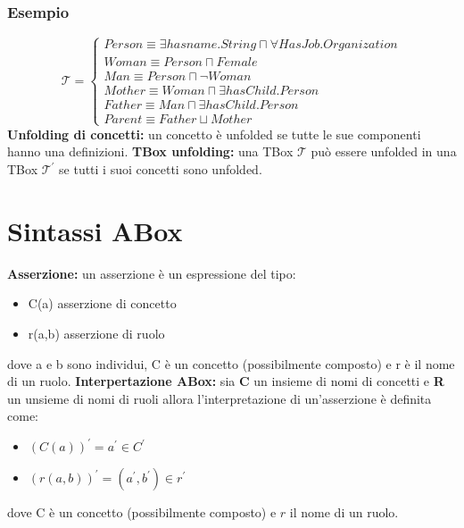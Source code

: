 \documentclass[../main.tex]{subfiles}
\newcommand{\spazio}{\vspace{2em} \newline}
\begin{document}
   \subsubsection{Esempio}
   \begin{equation*}
      \mathcal{T}=
      \begin{cases}
         Person \equiv \exists hasname.String \sqcap \forall HasJob.Organization\\
         Woman \equiv Person \sqcap  Female\\
         Man \equiv Person \sqcap  \lnot Woman\\
         Mother \equiv Woman \sqcap  \exists hasChild.Person\\
         Father \equiv Man \sqcap  \exists hasChild.Person\\
         Parent \equiv Father \sqcup Mother
      \end{cases}
   \end{equation*}
   \spazio
   \textbf{Unfolding di concetti:} un concetto è unfolded se tutte le sue componenti hanno una definizioni.
   \spazio
   \textbf{TBox unfolding:} una TBox $\mathcal{T}$ può essere unfolded in una TBox $\mathcal{T}^\prime$ se tutti i suoi concetti sono unfolded.

   \section{Sintassi ABox}
   \textbf{Asserzione:} un asserzione è un espressione del tipo:
   \begin{itemize}
      \item C(a) asserzione di concetto
      \item r(a,b) asserzione di ruolo
   \end{itemize}
   dove a e b sono individui, C è un concetto (possibilmente composto) e r è il nome di un ruolo.
   \spazio
   \textbf{Interpertazione ABox:} sia \textbf{C} un insieme di nomi di concetti e \textbf{R} un unsieme di nomi di ruoli allora l'interpretazione di un'asserzione è definita come:
   \begin{itemize}
      \item $(C(a))^\prime = a^\prime \in C^\prime$
      \item $(r(a, b))^\prime = (a^\prime,b^\prime) \in r^\prime$
   \end{itemize}
   dove C è un concetto (possibilmente composto) e $r$ il nome di un ruolo.
\end{document}
